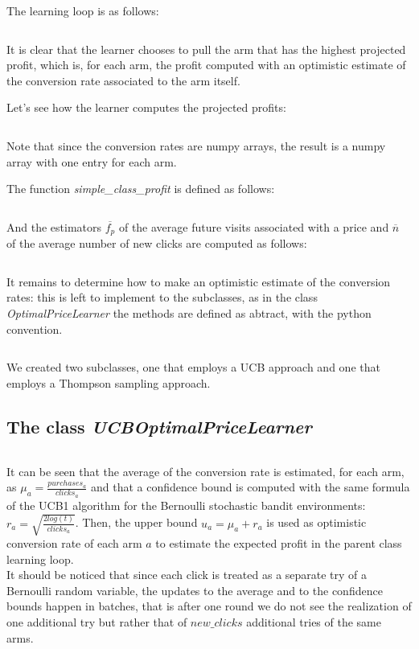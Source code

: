 \documentclass[11pt]{article} %
\begin{document}
The learning loop is as follows:
\inputminted{python}{code/step3_learning_loop.py}
It is clear that the learner chooses to pull the arm that has the highest projected profit, which is, for each arm, the profit computed with an optimistic estimate of the conversion rate associated to the arm itself.

Let's see how the learner computes the projected profits:
\inputminted{python}{code/step3_projected_profits.py}
Note that since the conversion rates are numpy arrays, the result is a numpy array with one entry for each arm.

The function \textit{simple\_class\_profit} is defined as follows:
\inputminted{python}{code/step3_simple_class_profit.py}
And the estimators $\overline{f_p}$ of the average future visits associated with a price and $\overline{n}$ of the average number of new clicks are computed as follows:
\inputminted{python}{code/step3_estimates.py}
It remains to determine how to make an optimistic estimate of the conversion rates: this is left to implement to the subclasses, as in the class \textit{OptimalPriceLearner} the methods are defined as abtract, with the python convention.
\inputminted{python}{code/step3_conversion_rates.py}
We created two subclasses, one that employs a UCB approach and one that employs a Thompson sampling approach.
\subsection{The class \textit{UCBOptimalPriceLearner}}
\inputminted{python}{code/step3_ucb.py}
It can be seen that the average of the conversion rate is estimated, for each arm, as $\mu_a=\frac{purchases_a}{clicks_a}$ and that a confidence bound is computed with the same formula of the UCB1 algorithm for the Bernoulli stochastic bandit environments: $r_a=\sqrt{\frac{2log(t)}{clicks_a}}$.
Then, the upper bound $u_a = \mu_a+r_a$ is used as optimistic conversion rate of each arm $a$ to estimate the expected profit in the parent class learning loop.\\

It should be noticed that since each click is treated as a separate try of a Bernoulli random variable, the updates to the average and to the confidence bounds happen in batches, that is after one round we do not see the realization of one additional try but rather that of $new\_clicks$ additional tries of the same arms.
\end{document}
